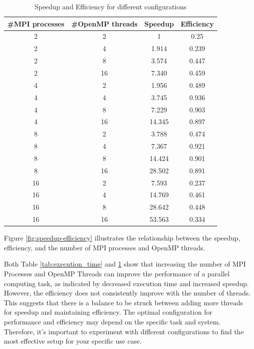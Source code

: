 \documentclass{solutionclass} %
\begin{document}
\begin{table}[htbp]
\centering
\begin{tabular}{cccc}
\hline
\textbf{\#MPI processes} & \textbf{\#OpenMP threads} & \textbf{Speedup} & \textbf{Efficiency} \\
\hline
2 & 2 & 1 & 0.25 \\
\hline
2 & 4 & 1.914 & 0.239 \\
\hline
2 & 8 & 3.574 & 0.447 \\
\hline
2 & 16 & 7.340 & 0.459 \\
\hline
4 & 2 & 1.956 & 0.489 \\
\hline
4 & 4 & 3.745 & 0.936 \\
\hline
4 & 8 & 7.229 & 0.903 \\
\hline
4 & 16 & 14.345 & 0.897 \\
\hline
8 & 2 & 3.788 & 0.474 \\
\hline
8 & 4 & 7.367 & 0.921 \\
\hline
8 & 8 & 14.424 & 0.901 \\
\hline
8 & 16 & 28.502 & 0.891 \\
\hline
16 & 2 & 7.593 & 0.237 \\
\hline
16 & 4 & 14.769 & 0.461 \\
\hline
16 & 8 & 28.642 & 0.448 \\
\hline
16 & 16 & 53.563 & 0.334 \\
\hline
\end{tabular}
\caption{Speedup and Efficiency for different configurations}
\label{tab:mpi_openmp}
\end{table}


Figure \ref{fig:speedup-efficiency} illustrates the relationship between the speedup, efficiency, and the number of MPI processes and OpenMP threads. 

Both Table \ref{tab:execution_time} and \ref{tab:mpi_openmp}  show that increasing the number of MPI Processes and OpenMP Threads can improve the performance of a parallel computing task, as indicated by decreased execution time and increased speedup. However, the efficiency does not consistently improve with the number of threads. This suggests that there is a balance to be struck between adding more threads for speedup and maintaining efficiency.
The optimal configuration for performance and efficiency may depend on the specific task and system. Therefore, it's important to experiment with different configurations to find the most effective setup for your specific use case.
\end{document}
